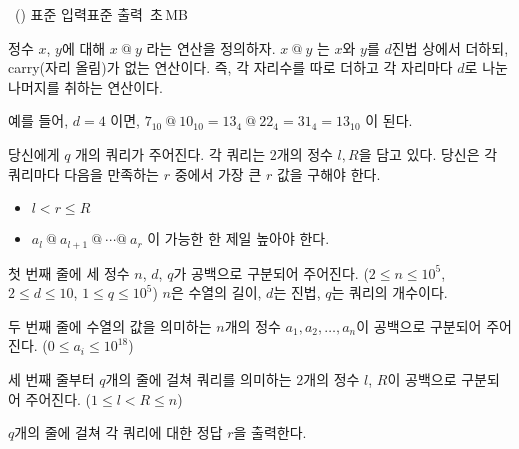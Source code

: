 \begin{problem}{\kcpcprobnocarry\ (\kcpcprobnocarryshort)}
    {표준 입력}{표준 출력}
    {\kcpcprobnocarrytime\,초}{\kcpcprobnocarrymemory\,MB}{}
    
    정수 $x$, $y$에 대해 $x\ @\ y$ 라는 연산을 정의하자. $x\ @\ y$ 는 $x$와 $y$를 $d$진법 상에서 더하되, carry(자리 올림)가 없는 연산이다. 즉, 각 자리수를 따로 더하고 각 자리마다 $d$로 나눈 나머지를 취하는 연산이다.
    
    예를 들어, $d=4$ 이면, $7_{10}\ @\ 10_{10} = 13_{4}\ @\ 22_{4} = 31_{4} = 13_{10}$ 이 된다.
    
    당신에게 $q$ 개의 쿼리가 주어진다. 각 쿼리는 $2$개의 정수 $l, R$을 담고 있다. 당신은 각 쿼리마다 다음을 만족하는 $r$ 중에서 가장 큰 $r$ 값을 구해야 한다.
    
    \begin{itemize}
    \item $l < r \le R$
    \item $a_{l}\ @\  a_{l+1}\ @\ \cdots @\  a_{r}$ 이 가능한 한 제일 높아야 한다.
    \end{itemize}
    
    
    \InputFile
    첫 번째 줄에 세 정수 $n$, $d$, $q$가 공백으로 구분되어 주어진다. ($2 \le n \le 10^5$, $2 \le d \le 10$, $1 \le q \le 10^5$) $n$은 수열의 길이, $d$는 진법, $q$는 쿼리의 개수이다.
    
    두 번째 줄에 수열의 값을 의미하는 $n$개의 정수 $a_{1}, a_{2}, \ldots, a_{n}$이 공백으로 구분되어 주어진다. ($0 \le a_{i} \le 10^{18}$)
    
    세 번째 줄부터 $q$개의 줄에 걸쳐 쿼리를 의미하는 $2$개의 정수 $l$, $R$이 공백으로 구분되어 주어진다. ($1 \le l < R \le n$)
    
    \OutputFile
    $q$개의 줄에 걸쳐 각 쿼리에 대한 정답 $r$을 출력한다.
    
    \Examples
    \begin{example}
    \end{example}
\end{problem}

